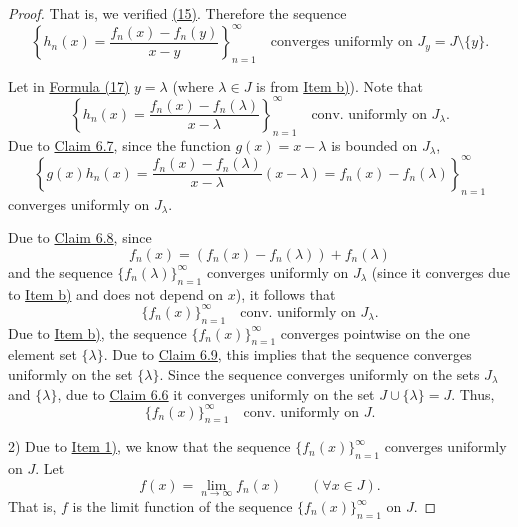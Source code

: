 \begin{proof}
That is, we verified \hyperref[eq:6:15:1]{(15)}. Therefore the sequence
\[
\left\{h_n(x)=\frac{f_n(x)-f_n(y)}{x-y}\right\}_{n=1}^{\infty}
\quad\text{converges uniformly on }J_y=J\setminus\{y\}.
\tag{17}\label{eq:6:17:1}
\]

Let in \hyperref[eq:6:17:1]{Formula (17)} $y=\lambda$ (where $\lambda\in J$ is from \hyperref[item:claim:6.10:b]{Item b)}). Note that
\[
\left\{h_n(x)=\frac{f_n(x)-f_n(\lambda)}{x-\lambda}\right\}_{n=1}^{\infty}
\quad\text{conv. uniformly on }J_\lambda.
\]
Due to \hyperref[claim:6.7]{Claim 6.7}, since the function $g(x)=x-\lambda$ is bounded on $J_\lambda$,
\[
\left\{g(x)h_n(x)=\frac{f_n(x)-f_n(\lambda)}{x-\lambda}(x-\lambda)=f_n(x)-f_n(\lambda)\right\}_{n=1}^{\infty}
\]
converges uniformly on $J_\lambda$.

Due to \hyperref[claim:6.8]{Claim 6.8}, since
\[
f_n(x)=(f_n(x)-f_n(\lambda))+f_n(\lambda)
\]
and the sequence $\{f_n(\lambda)\}_{n=1}^{\infty}$ converges uniformly on $J_\lambda$ (since it converges due to \hyperref[item:claim:6.10:b]{Item b)} and does not depend on $x$), it follows that
\[
\{f_n(x)\}_{n=1}^{\infty}\quad\text{conv. uniformly on }J_\lambda.
\]
Due to \hyperref[item:claim:6.10:b]{Item b)}, the sequence $\{f_n(x)\}_{n=1}^{\infty}$ converges pointwise on the one element set $\{\lambda\}$. Due to \hyperref[claim:6.9]{Claim 6.9}, this implies that the sequence converges uniformly on the set $\{\lambda\}$. Since the sequence converges uniformly on the sets $J_\lambda$ and $\{\lambda\}$, due to \hyperref[claim:6.6]{Claim 6.6} it converges uniformly on the set $J\cup\{\lambda\}=J$.
Thus,
\[
\{f_n(x)\}_{n=1}^{\infty}\quad\text{conv. uniformly on }J.
\]

2) Due to \hyperref[item:claim:6.10:1]{Item 1)}, we know that the sequence $\{f_n(x)\}_{n=1}^{\infty}$ converges uniformly on $J$.
Let
\[
f(x)=\lim_{n\to\infty}f_n(x)\qquad(\forall x\in J).
\tag{18}\label{eq:6:18:1}
\]
That is, $f$ is the limit function of the sequence $\{f_n(x)\}_{n=1}^{\infty}$ on $J$.


\end{proof}
